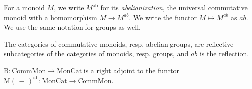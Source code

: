 \documentclass{amsbook} %
\newcommand{\cmon}{\ensuremath{\textrm{CommMon}}}
\newcommand{\moncat}{\ensuremath{\textrm{MonCat}}}
\numberwithin{section}{chapter}
\begin{document}
\begin{Defi} For a monoid $M$, we write $M^{\mathrm{ab}}$ for its \emph{abelianization}, the universal commutative monoid with a homomorphism $M \to M^{ab}$.  We write the functor $M \mapsto M^{ab}$ as $ab$. We use the same notation for groups as well.
\end{Defi}

\begin{rem}
The categories of commutative monoids, resp. abelian groups, are reflective subcategories of the categories of monoids, resp. groups, and $ab$ is the reflection.
\end{rem}


\begin{prop}\label{Moradj} $\mathrm{B}: \cmon \to \moncat$ is a right adjoint to the functor $\mathrm{M}(\, - \,)^{\mathrm{ab}} : \moncat \to \cmon$.
\end{prop}
\end{document}
